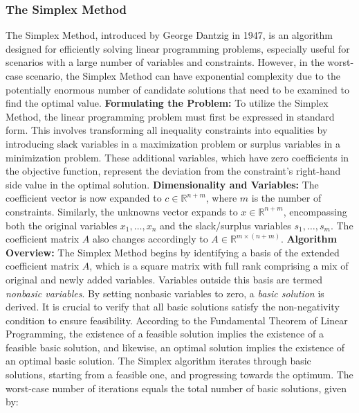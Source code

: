 \documentclass[unicode,11pt,a4paper,oneside,numbers=endperiod,openany]{scrartcl}
\begin{document}
\subsubsection{The Simplex Method}
The Simplex Method, introduced by George Dantzig in 1947, is an algorithm designed for efficiently solving linear programming problems, especially useful for scenarios with a large number of variables and constraints. However, in the worst-case scenario, the Simplex Method can have exponential complexity due to the potentially enormous number of candidate solutions that need to be examined to find the optimal value.
\newline \newline
\textbf{Formulating the Problem:}
To utilize the Simplex Method, the linear programming problem must first be expressed in standard form. This involves transforming all inequality constraints into equalities by introducing slack variables in a maximization problem or surplus variables in a minimization problem. These additional variables, which have zero coefficients in the objective function, represent the deviation from the constraint's right-hand side value in the optimal solution.
\newline\newline
\textbf{Dimensionality and Variables:}
The coefficient vector is now expanded to \( c \in \mathbb{R}^{n+m} \), where \( m \) is the number of constraints. Similarly, the unknowns vector expands to \( x \in \mathbb{R}^{n+m} \), encompassing both the original variables \( x_1, \ldots, x_n \) and the slack/surplus variables \( s_1, \ldots, s_m \). The coefficient matrix \( A \) also changes accordingly to \( A \in \mathbb{R}^{m \times (n+m)} \).
\newline\newline
\textbf{Algorithm Overview:}
The Simplex Method begins by identifying a basis of the extended coefficient matrix \( A \), which is a square matrix with full rank comprising a mix of original and newly added variables. Variables outside this basis are termed \textit{nonbasic variables}. By setting nonbasic variables to zero, a \textit{basic solution} is derived. It is crucial to verify that all basic solutions satisfy the non-negativity condition to ensure feasibility.
\newline
According to the Fundamental Theorem of Linear Programming, the existence of a feasible solution implies the existence of a feasible basic solution, and likewise, an optimal solution implies the existence of an optimal basic solution. The Simplex algorithm iterates through basic solutions, starting from a feasible one, and progressing towards the optimum. The worst-case number of iterations equals the total number of basic solutions, given by:
\end{document}
